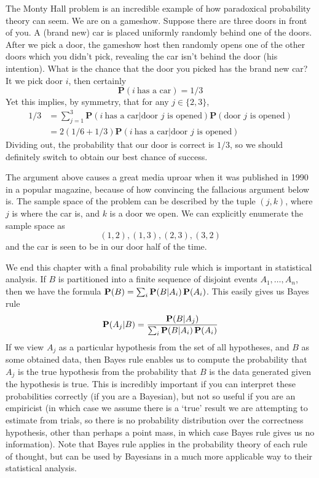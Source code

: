 \begin{example}
    The Monty Hall problem is an incredible example of how paradoxical probability theory can seem. We are on a gameshow. Suppose there are three doors in front of you. A (brand new) car is placed uniformly randomly behind one of the doors. After we pick a door, the gameshow host then randomly opens one of the other doors which you didn't pick, revealing the car isn't behind the door (his intention). What is the chance that the door you picked has the brand new car? It we pick door $i$, then certainly
    \[ \mathbf{P}(i\ \text{has a car}) = 1/3 \]
    Yet this implies, by symmetry, that for any $j \in \{ 2, 3 \}$,
    \begin{align*}
        1/3 &= \sum_{j = 1}^3 \mathbf{P}(i\ \text{has a car} | \text{door $j$ is opened}) \mathbf{P}(\text{door $j$ is opened})\\
        &= 2(1/6 + 1/3) \mathbf{P}(i\ \text{has a car} | \text{door $j$ is opened})
    \end{align*}
    Dividing out, the probability that our door is correct is $1/3$, so we should definitely switch to obtain our best chance of success.

    The argument above causes a great media uproar when it was published in 1990 in a popular magazine, because of how convincing the fallacious argument below is. The sample space of the problem can be described by the tuple $(j,k)$, where $j$ is where the car is, and $k$ is a door we open. We can explicitly enumerate the sample space as
    \[ (1,2),(1,3),(2,3),(3,2) \]
    and the car is seen to be in our door half of the time.
\end{example}

We end this chapter with a final probability rule which is important in statistical analysis. If $B$ is partitioned into a finite sequence of disjoint events $A_1, \dots, A_n$, then we have the formula $\operatorname{\mathbf{P}}(B) = \sum_i \operatorname{\mathbf{P}}(B | A_i) \operatorname{\mathbf{P}}(A_i)$. This easily gives us Bayes rule
%
\[ \operatorname{\mathbf{P}}(A_j | B) = \frac{\operatorname{\mathbf{P}}(B | A_j)}{\sum_i \operatorname{\mathbf{P}}(B | A_i) \operatorname{\mathbf{P}}(A_i)} \]
%
If we view $A_j$ as a particular hypothesis from the set of all hypotheses, and $B$ as some obtained data, then Bayes rule enables us to compute the probability that $A_j$ is the true hypothesis from the probability that $B$ is the data generated given the hypothesis is true. This is incredibly important if you can interpret these probabilities correctly (if you are a Bayesian), but not so useful if you are an empiricist (in which case we assume there is a `true' result we are attempting to estimate from trials, so there is no probability distribution over the correctness hypothesis, other than perhaps a point mass, in which case Bayes rule gives us no information). Note that Bayes rule applies in the probability theory of each rule of thought, but can be used by Bayesians in a much more applicable way to their statistical analysis.


